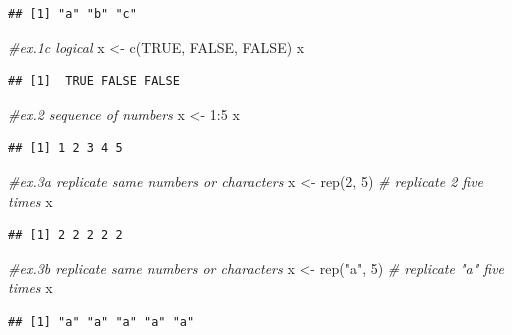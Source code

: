 \documentclass[
]{article}
\newenvironment{Shaded}{\begin{snugshade}}{\end{snugshade}}
\newcommand{\CommentTok}[1]{\textcolor[rgb]{0.56,0.35,0.01}{\textit{#1}}}
\newcommand{\ConstantTok}[1]{\textcolor[rgb]{0.00,0.00,0.00}{#1}}
\newcommand{\DecValTok}[1]{\textcolor[rgb]{0.00,0.00,0.81}{#1}}
\newcommand{\FunctionTok}[1]{\textcolor[rgb]{0.00,0.00,0.00}{#1}}
\newcommand{\NormalTok}[1]{#1}
\newcommand{\OtherTok}[1]{\textcolor[rgb]{0.56,0.35,0.01}{#1}}
\newcommand{\SpecialCharTok}[1]{\textcolor[rgb]{0.00,0.00,0.00}{#1}}
\newcommand{\StringTok}[1]{\textcolor[rgb]{0.31,0.60,0.02}{#1}}
\begin{document}
\begin{verbatim}
## [1] "a" "b" "c"
\end{verbatim}

\begin{Shaded}
\begin{Highlighting}[]
\CommentTok{\#ex.1c logical}
\NormalTok{x }\OtherTok{\textless{}{-}} \FunctionTok{c}\NormalTok{(}\ConstantTok{TRUE}\NormalTok{, }\ConstantTok{FALSE}\NormalTok{, }\ConstantTok{FALSE}\NormalTok{)}
\NormalTok{x}
\end{Highlighting}
\end{Shaded}

\begin{verbatim}
## [1]  TRUE FALSE FALSE
\end{verbatim}

\begin{Shaded}
\begin{Highlighting}[]
\CommentTok{\#ex.2 sequence of numbers}
\NormalTok{x }\OtherTok{\textless{}{-}} \DecValTok{1}\SpecialCharTok{:}\DecValTok{5}
\NormalTok{x}
\end{Highlighting}
\end{Shaded}

\begin{verbatim}
## [1] 1 2 3 4 5
\end{verbatim}

\begin{Shaded}
\begin{Highlighting}[]
\CommentTok{\#ex.3a replicate same numbers or characters}
\NormalTok{x }\OtherTok{\textless{}{-}} \FunctionTok{rep}\NormalTok{(}\DecValTok{2}\NormalTok{, }\DecValTok{5}\NormalTok{) }\CommentTok{\# replicate 2 five times}
\NormalTok{x}
\end{Highlighting}
\end{Shaded}

\begin{verbatim}
## [1] 2 2 2 2 2
\end{verbatim}

\begin{Shaded}
\begin{Highlighting}[]
\CommentTok{\#ex.3b replicate same numbers or characters}
\NormalTok{x }\OtherTok{\textless{}{-}} \FunctionTok{rep}\NormalTok{(}\StringTok{"a"}\NormalTok{, }\DecValTok{5}\NormalTok{) }\CommentTok{\# replicate "a" five times}
\NormalTok{x}
\end{Highlighting}
\end{Shaded}

\begin{verbatim}
## [1] "a" "a" "a" "a" "a"
\end{verbatim}
\end{document}
